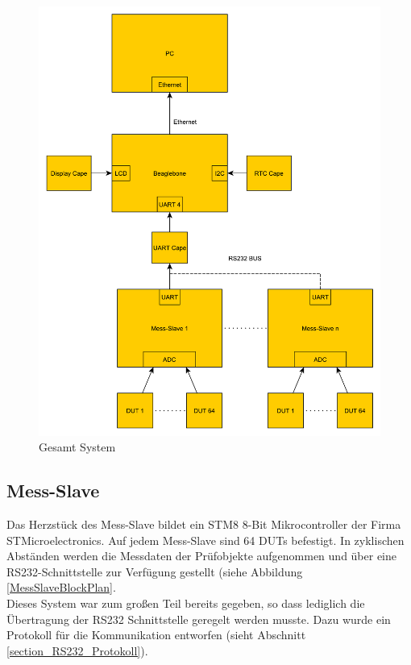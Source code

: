 \begin{figure}[H]
\begin{center}
\includegraphics[width=\textwidth]{img/general/BlockPlan.pdf}
\caption{Gesamt System}
\label{Gesamt_System}
\end{center}
\end{figure}


\subsection{Mess-Slave}
\label{section_Mess-Slave}

Das Herzstück des Mess-Slave bildet ein STM8  8-Bit Mikrocontroller der Firma STMicroelectronics.
Auf jedem Mess-Slave sind 64 \acp{DUT} befestigt. In zyklischen Abständen werden die Messdaten der Prüfobjekte aufgenommen und über eine RS232-Schnittstelle zur Verfügung gestellt (siehe Abbildung \ref{MessSlaveBlockPlan}.\\
Dieses System war zum großen Teil bereits gegeben, so dass lediglich die Übertragung der RS232 Schnittstelle geregelt werden musste. Dazu wurde ein Protokoll für die Kommunikation entworfen (sieht Abschnitt \ref{section_RS232_Protokoll}).
\\


